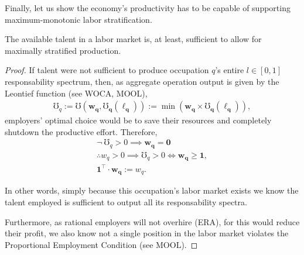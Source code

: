 \documentclass[hidelinks, nonatbib]{elsarticle}
\begin{document}
Finally, let us show the economy's productivity has to be capable of supporting maximum-monotonic labor stratification.
\begin{lemma}
    The available talent in a labor market is, at least, sufficient to allow for maximally stratified production.
    
    \begin{proof}
        If talent were not sufficient to produce occupation $q$'s entire $l \in [0,1]$ responsability spectrum, then, as aggregate operation output is given by the Leontief function (see WOCA, MOOL),
        \begin{gather}
        \mho_q 
        := 
        \mho(
            \boldsymbol{w_q}
            ,
            \boldsymbol{\mho_q}(
                \boldsymbol{\ell_q}
            )
        )
        := 
        \min\left(
            \boldsymbol{w_q}
            \times
            \boldsymbol{\mho_q}(
                \boldsymbol{\ell_q}
            )
        \right)
        ,
        \end{gather}
        employers' optimal choice would be to save their resources and completely shutdown the productive effort. Therefore,
        \begin{gather}
        \lnot \
        \mho_q > 0
        \implies
        \boldsymbol{w_q} =
        \boldsymbol{0}
        \\
        \therefore
        w_q > 0 
        \implies 
        \mho_q > 0
        \iff
        \boldsymbol{w_q}
        \geq
        \boldsymbol{1}
        ,
        \\
        \boldsymbol{1} ^ \top
        \cdot
        \boldsymbol{w_q}
        :=
        w_q
        .
        \end{gather}
        
        In other words, simply because this occupation's labor market exists we know the talent employed is sufficient to output all its responsability spectra.
        
        Furthermore, as rational employers will not overhire (ERA), for this would reduce their profit, we also know not a single position in the labor market violates the Proportional Employment Condition (see MOOL).
        

\end{proof}
\end{lemma}
\end{document}
